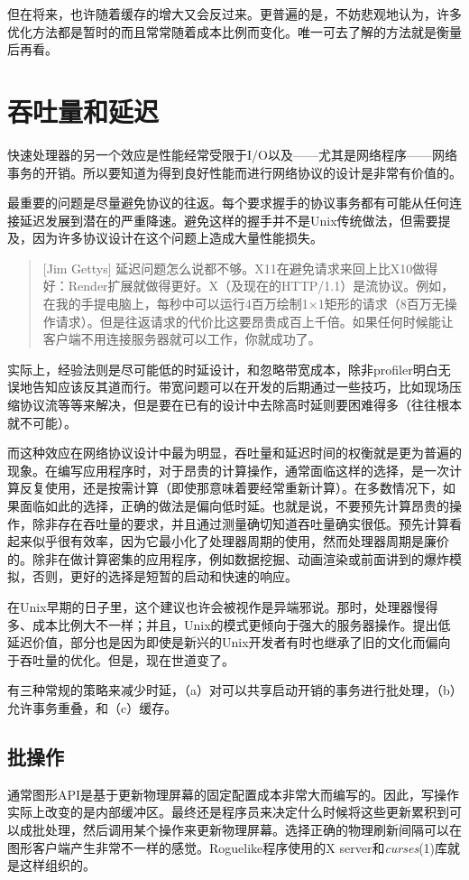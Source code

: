 \documentclass[12pt,oneside]{book}
\begin{document}
但在将来，也许随着缓存的增大又会反过来。更普遍的是，不妨悲观地认为，许多优化方法都是暂时的而且常常随着成本比例而变化。唯一可去了解的方法就是衡量后再看。

\section{吞吐量和延迟}
快速处理器的另一个效应是性能经常受限于I/O以及——尤其是网络程序——网络事务的开销。所以要知道为得到良好性能而进行网络协议的设计是非常有价值的。

最重要的问题是尽量避免协议的往返。每个要求握手的协议事务都有可能从任何连接延迟发展到潜在的严重降速。避免这样的握手并不是Unix传统做法，但需要提及，因为许多协议设计在这个问题上造成大量性能损失。

\begin{quote}[Jim Gettys]
延迟问题怎么说都不够。X11在避免请求来回上比X10做得好：Render扩展就做得更好。X（及现在的HTTP/1.1）是流协议。例如，在我的手提电脑上，每秒中可以运行4百万绘制1×1矩形的请求（8百万无操作请求）。但是往返请求的代价比这要昂贵成百上千倍。如果任何时候能让客户端不用连接服务器就可以工作，你就成功了。
\end{quote}

实际上，经验法则是尽可能低的时延设计，和忽略带宽成本，除非profiler明白无误地告知应该反其道而行。带宽问题可以在开发的后期通过一些技巧，比如现场压缩协议流等等来解决，但是要在已有的设计中去除高时延则要困难得多（往往根本就不可能）。

而这种效应在网络协议设计中最为明显，吞吐量和延迟时间的权衡就是更为普遍的现象。在编写应用程序时，对于昂贵的计算操作，通常面临这样的选择，是一次计算反复使用，还是按需计算（即使那意味着要经常重新计算）。在多数情况下，如果面临如此的选择，正确的做法是偏向低时延。也就是说，不要预先计算昂贵的操作，除非存在吞吐量的要求，并且通过测量确切知道吞吐量确实很低。预先计算看起来似乎很有效率，因为它最小化了处理器周期的使用，然而处理器周期是廉价的。除非在做计算密集的应用程序，例如数据挖掘、动画渲染或前面讲到的爆炸模拟，否则，更好的选择是短暂的启动和快速的响应。

在Unix早期的日子里，这个建议也许会被视作是异端邪说。那时，处理器慢得多、成本比例大不一样；并且，Unix的模式更倾向于强大的服务器操作。提出低延迟价值，部分也是因为即使是新兴的Unix开发者有时也继承了旧的文化而偏向于吞吐量的优化。但是，现在世道变了。

有三种常规的策略来减少时延，（a）对可以共享启动开销的事务进行批处理，（b）允许事务重叠，和（c）缓存。

\subsection{批操作}
通常图形API是基于更新物理屏幕的固定配置成本非常大而编写的。因此，写操作实际上改变的是内部缓冲区。最终还是程序员来决定什么时候将这些更新累积到可以成批处理，然后调用某个操作来更新物理屏幕。选择正确的物理刷新间隔可以在图形客户端产生非常不一样的感觉。Roguelike程序使用的X server和\textit{curses}(1)库就是这样组织的。
\end{document}
